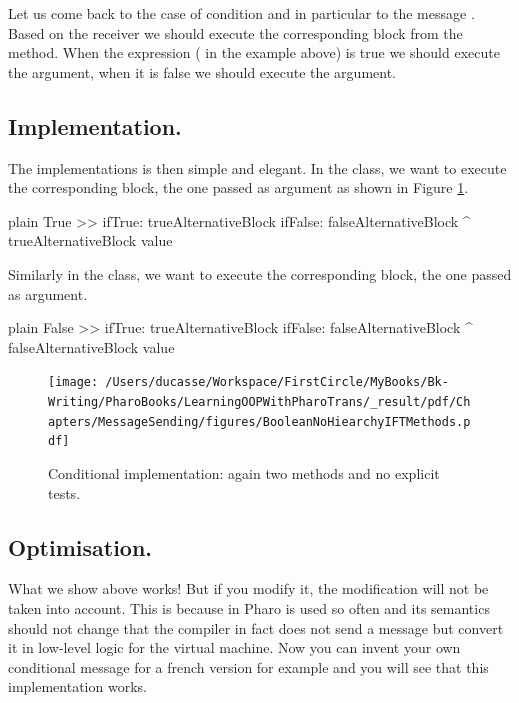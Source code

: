 \documentclass[10pt,twoside,english]{_support/latex/sbabook/sbabook}
\begin{document}
Let us come back to the case of condition and in particular to the message .
Based on the receiver we should execute the corresponding block from the  method. When the expression ( in the example above) is true we should execute the  argument, when it is false we should execute the  argument. 
\subsection{Implementation. }
The implementations is then simple and elegant.  In the  class, we want to execute the corresponding block, 
the one passed as  argument as shown in Figure \ref{figFT}. 

\begin{displaycode}{plain}
True >> ifTrue: trueAlternativeBlock ifFalse: falseAlternativeBlock
   ^ trueAlternativeBlock value
\end{displaycode}

Similarly in the  class, we want to execute the corresponding block, 
the one passed as  argument. 

\begin{displaycode}{plain}
False >> ifTrue: trueAlternativeBlock ifFalse: falseAlternativeBlock
   ^ falseAlternativeBlock value
\end{displaycode}


\begin{figure}

\begin{center}
\texttt{[image: /Users/ducasse/Workspace/FirstCircle/MyBooks/Bk-Writing/PharoBooks/LearningOOPWithPharoTrans/\_result/pdf/Chapters/MessageSending/figures/BooleanNoHiearchyIFTMethods.pdf]}\caption{Conditional implementation: again two methods and no explicit tests.\label{figFT}}\end{center}
\end{figure}

\subsection{Optimisation. }
What we show above works! But if you modify it, the modification will not be taken into account. 
This is because in Pharo  is used so often and its semantics should not change that the compiler in fact does not send a message but convert it in low-level logic for the virtual machine. 
Now you can invent your own conditional message  for a french version for example and you will see that this implementation works.
\end{document}
